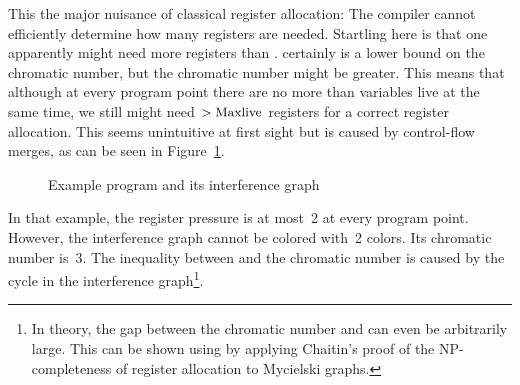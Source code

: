{This the major nuisance of classical register allocation:
The compiler cannot efficiently determine how many registers are needed.
Startling here is that one apparently might need more registers than \maxlive.
\maxlive certainly is a lower bound on the chromatic number, but the chromatic number might be greater. 
This means that although at every program point there are no more than \maxlive variables live at the same time, we still might need $>\mathrm{Maxlive}$ registers for a correct register allocation.
This seems unintuitive at first sight but is caused by control-flow merges, as can be seen in Figure~\ref{fig:ra:exprg}.

\begin{figure}[htbp]
	\begin{center}
		\qquad
	\end{center}
	\caption{Example program and its interference graph}
	\label{fig:ra:exprg}
\end{figure}

In that example, the register pressure is at most~2 at every program point.
However, the interference graph cannot be colored with~2 colors. 
Its chromatic number is~3.
The inequality between \maxlive and the chromatic number is caused by the cycle in the interference graph\footnote{In theory, the gap between the chromatic number and \maxlive can even be arbitrarily large. This can be shown using by applying Chaitin's proof of the NP-completeness of register allocation to Mycielski graphs.}.

}
